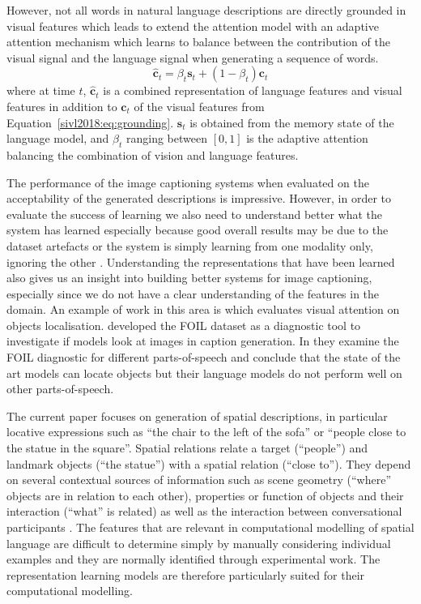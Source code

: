 However, not all words in natural language descriptions are directly grounded
in visual features which leads \cite{lu2017knowing} to extend the attention
model \cite{xu2015show} with an adaptive attention mechanism which learns to
balance between the contribution of the visual signal and the language signal
when generating a sequence of words.
\begin{equation}\label{sivl2018:eq:adaptive-attention}
\hat{\bm{c}}_t = \beta_t \bm{s}_t + (1-\beta_t) \bm{c}_t
\end{equation}
where at time $t$, $\hat{\bm{c}}_t$ is a combined representation of language
features and visual features in addition to $\bm{c}_t$ of the visual features
from Equation~\ref{sivl2018:eq:grounding}. $\bm{s}_t$ is obtained from the memory state
of the language model, and $\beta_t$ ranging between $[0, 1]$ is the adaptive
attention balancing the combination of vision and language features.

The performance of the image captioning systems when evaluated on the
acceptability of the generated descriptions is impressive. However, in order to
evaluate the success of learning we also need to understand better what the
system has learned especially because good overall results may be due to the
dataset artefacts or the system is simply learning from one modality only,
ignoring the other \cite{agrawal2018don}. Understanding the representations
that have been learned also gives us an insight into building better systems
for image captioning, especially since we do not have a clear understanding of
the features in the domain. An example of work in this area is \cite{liu2017attention} which evaluates
visual attention on objects localisation. \cite{shekhar2017foil_acl} developed
the FOIL dataset as a diagnostic tool to investigate if models look at images
in caption generation. In \cite{shekhar2017vision} they examine the FOIL diagnostic for different
parts-of-speech and conclude that the state of the art models can locate
objects but their language models do not perform well on other parts-of-speech.

The current paper focuses on generation of spatial descriptions, in particular
locative expressions such as ``the chair to the left of the sofa'' or ``people
close to the statue in the square''. Spatial relations relate a target
(``people'') and landmark objects (``the statue'') with a spatial relation
(``close to''). They depend on several contextual sources of information such as
scene geometry (``where'' objects are in relation to each other), properties
or function of objects and their interaction (``what'' is related) as well as
the interaction between conversational participants \cite{herskovits1986language,Landau:1993aa,Regier:1996,Coventry:2004aa,Dobnik:2017af}.
The features that are relevant in computational modelling of spatial language
are difficult to determine simply by manually considering individual examples and they are normally
identified through experimental work. The representation learning models are
therefore particularly suited for their computational modelling.

